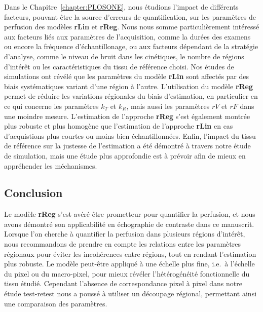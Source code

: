 \begin{otherlanguage}{francais}
Dans le Chapitre~\ref{chapter:PLOSONE}, nous \'etudions l'impact de diff\'erents facteurs, pouvant \^etre la source d'erreurs de quantification, sur les param\`etres de perfusion des mod\`eles \textbf{rLin} et \textbf{rReg}.
Nous nous somme particuli\`erement int\'eress\'e aux facteurs li\'es aux param\`etres de l'acquisition, comme la dur\'ees des examens ou encore la fr\'equence d'\'echantillonage, ou aux facteurs d\'ependant de la strat\'egie d'analyse, comme le niveau de bruit dans les cin\'etiques, le nombre de r\'egions d'int\'er\^et ou les caract\'eristiques du tissu de r\'ef\'erence choisi.
Nos \'etudes de simulations ont r\'ev\'el\'e que les param\`etres du mod\`ele \textbf{rLin} sont affect\'es par des biais syst\'ematiques variant d'une r\'egion \`a l'autre.
L'utilisation du mod\`ele \textbf{rReg} permet de r\'eduire les variations r\'egionales du biais d'estimation, en particulier en ce qui concerne les param\`etres $k_T$ et $k_R$, mais aussi les param\`etres $rV$ et $rF$
dans une moindre mesure.
L'estimation de l'approche \textbf{rReg} s'est \'egalement montr\'ee plus robuste et plus homog\`ene que l'estimation de l'approche \textbf{rLin} en cas d'acquistions plus courtes ou moins bien \'echantillonn\'ees.
Enfin, l'impact du tissu de r\'ef\'erence sur la justesse de l'estimation a \'et\'e d\'emontr\'e \`a travers notre \'etude de simulation, mais une \'etude plus approfondie est \`a pr\'evoir afin de mieux en appr\'ehender les m\'echanismes.

\subsection*{Conclusion}
Le mod\`ele \textbf{rReg} s'est av\'er\'e \^etre prometteur pour quantifier la perfusion, et nous avons d\'emontr\'e son applicabilit\'e en \'echographie de contraste dans ce manuscrit.
Lorsque l'on cherche \`a quantifier la perfusion dans plusieurs r\'egions d'int\'er\^et, nous recommandons de prendre en compte les relations entre les param\`etres r\'egionaux pour \'eviter les incoh\'erences entre r\'egions, tout en rendant l'estimation plus robuste.
Le mod\`ele peut-\^etre appliqu\'e \`a une \'echelle plus fine, i.e.~\`a l'\'echelle du pixel ou du macro-pixel, pour mieux r\'ev\'eler l'h\'et\'erog\'en\'eit\'e fonctionnelle du tissu \'etudi\'e.
Cependant l'absence de correspondance pixel \`a pixel dans notre \'etude test-retest nous a pouss\'e \`a utiliser un d\'ecoupage r\'egional, permettant ainsi une comparaison des param\`etres.


\end{otherlanguage}
